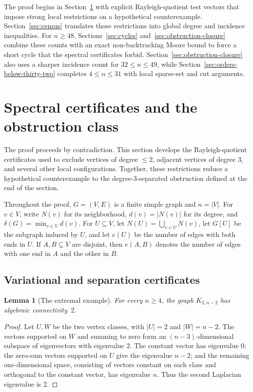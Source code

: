 \documentclass[11pt]{article}
\numberwithin{equation}{section}
\newtheorem{lemma}[theorem]{Lemma}
\theoremstyle{definition}
\theoremstyle{remark}
\begin{document}
The proof begins in Section~\ref{sec:certificates} with explicit
Rayleigh-quotient test vectors that impose strong local restrictions on a
hypothetical counterexample.  Section~\ref{sec:census} translates those
restrictions into global degree and incidence inequalities.  For \(n\ge48\),
Sections~\ref{sec:cycles} and~\ref{sec:obstruction-closure} combine these counts
with an exact non-backtracking Moore bound to force a short cycle that the
spectral certificates forbid.  Section~\ref{sec:obstruction-closure} also uses
a sharper incidence count for \(32\le n\le49\), while
Section~\ref{sec:orders-below-thirty-two} completes \(4\le n\le31\) with local
sparse-set and cut arguments.

\section{Spectral certificates and the obstruction class}
\label{sec:certificates}

The proof proceeds by contradiction.  This section
develops the Rayleigh-quotient certificates used to exclude vertices of
degree \(\le2\), adjacent vertices of degree \(3\), and several other
local configurations.  Together, these restrictions reduce a hypothetical
counterexample to the degree-\(3\)-separated obstruction defined at the end
of the section.

Throughout the proof, \(G=(V,E)\) is a finite simple graph and \(n=|V|\).
For \(v\in V\), write \(N(v)\) for its neighborhood,
\(d(v)=|N(v)|\) for its degree, and
\(\delta(G)=\min_{v\in V}d(v)\).  For \(U\subseteq V\), let
\(N(U)=\bigcup_{v\in U}N(v)\), let \(G[U]\) be the subgraph induced by
\(U\), and let \(e(U)\) be the number of edges with both ends in \(U\).
If \(A,B\subseteq V\) are disjoint, then \(e(A,B)\) denotes the number of
edges with one end in \(A\) and the other in \(B\).

\subsection{Variational and separation certificates}

\begin{lemma}[The extremal example]\label{lem:bipartite-spectrum}
For every \(n\ge4\), the graph \(K_{2,n-2}\) has algebraic connectivity~\(2\).
\end{lemma}

\begin{proof}
Let \(U,W\) be the two vertex classes, with \(|U|=2\) and \(|W|=n-2\).
The vectors supported on \(W\) and summing to zero form an
\((n-3)\)-dimensional subspace of eigenvectors with eigenvalue \(2\).  The
constant vector
has eigenvalue \(0\); the zero-sum vectors supported on \(U\) give the
eigenvalue \(n-2\); and the remaining one-dimensional space, consisting of
vectors constant on each class and orthogonal to the constant vector, has
eigenvalue \(n\).  Thus the second Laplacian eigenvalue is \(2\).
\end{proof}
\end{document}
